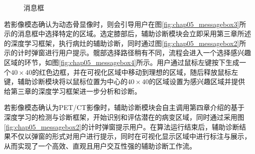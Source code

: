 \begin{figure}[htbp]
    \centering
    \hfill
    \hfill
    \hfill
    \label{fig:chap05_messagebox}
    \caption{消息框}
\end{figure}

若影像模态确认为动态骨显像时，则会引导用户在图\ref{fig:chap05_messagebox3}所示的消息框中选择特定的区域。选定膝部后，辅助诊断模块会立即采用第三章所述的深度学习框架，执行病灶的辅助诊断，同时通过图\ref{fig:chap05_messagebox2}所示的计时弹窗进行用户提示。髋部选择路径稍有不同，流程会进入一个选择感兴趣区域的环节，如图\ref{fig:chap05_messagebox4}所示。用户通过鼠标左键按下生成一个\(40 \times 40\)的红色边框，并在可视化区域中移动到理想的区域，随后释放鼠标左键，辅助诊断模块将以鼠标位置为中心的\(40 \times40 \)的区域设置为感兴趣区域并提供给第三章的深度学习框架进一步分析和诊断。

若影像模态确认为PET/CT影像时，辅助诊断模块会自主调用第四章介绍的基于深度学习的检测与诊断框架，开始识别和评估潜在的病变区域，同时通过采用图\ref{fig:chap05_messagebox2}的计时弹窗提示用户。在算法运行结束后，辅助诊断结果不仅以弹窗的形式对用户进行提示，同时在可视化显示区域中进行标注与展示，从而实现了一个高效、直观且用户交互性强的辅助诊断工作流。

